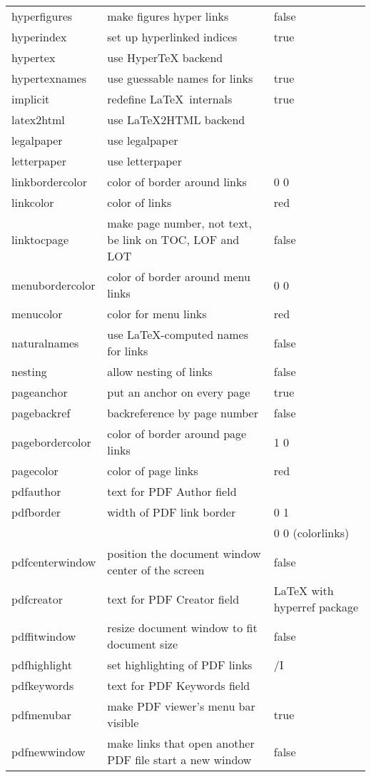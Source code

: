 \documentclass{article}
\newcommand{\optempty}{{\rmfamily\textit{empty}}}
\newcommand*{\for}[1]{{\rmfamily(#1)}}
\begin{document}
\begin{longtable}{>{\ttfamily}lp{5cm}>{\ttfamily}l}
hyperfigures &make figures hyper links&false\\
hyperindex &set up hyperlinked indices&true\\
hypertex &use HyperTeX backend\\
hypertexnames &use guessable names for links&true\\
implicit &redefine \LaTeX\ internals&true\\
latex2html &use \LaTeX2HTML backend\\
legalpaper &use legalpaper\\
letterpaper &use letterpaper\\
linkbordercolor &color of border around links& 1 0 0\\
linkcolor &color of links&red\\
linktocpage &make page number, not text, be link on TOC, LOF and LOT&false\\
menubordercolor &color of border around menu links& 1 0 0\\
menucolor &color for menu links&red\\
naturalnames &use \LaTeX-computed names for links&false\\
nesting &allow nesting of links&false\\
pageanchor &put an anchor on every page&true\\
pagebackref &backreference by page number&false\\
pagebordercolor &color of border around page links& 1 1 0\\
pagecolor &color of page links&red\\
pdfauthor &text for PDF Author field&\optempty\\
pdfborder &width of PDF link border&0 0 1\\
&&0 0 0 \for{colorlinks}\\
pdfcenterwindow &position the document window center of the screen&false\\
pdfcreator &text for PDF Creator field&LaTeX with hyperref package\\
pdffitwindow &resize document window to fit document size&false\\
pdfhighlight &set highlighting of PDF links& /I\\
pdfkeywords &text for PDF Keywords field&\optempty\\
pdfmenubar &make PDF  viewer's menu bar visible&true\\
pdfnewwindow &make links that open another PDF file start a new window&false\\

\end{longtable}
\end{document}
